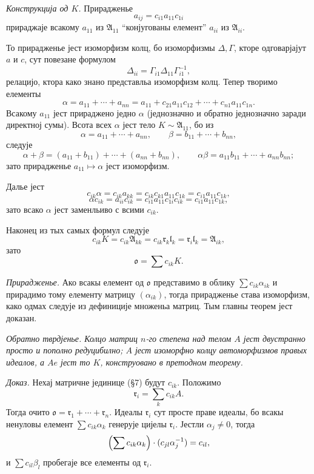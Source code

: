 ﻿\documentclass[11pt]{article}
\providecommand{\mA}{\mathfrak{A}}
\providecommand{\ml}{\mathfrak{l}}
\providecommand{\mo}{\mathfrak{o}}
\providecommand{\mr}{\mathfrak{r}}
\begin{document}

\emph{Конструкција од $K$.} Прирадженье
\[
        a_{ij}=c_{i1}a_{11}c_{1i}
\]
прираджаје всакому $a_{11}$ из $\mA_{11}$ ``конјугованы елемент'' $a_{ii}$ из $\mA_{ii}$.

То прирадженье јест изоморфизм колц, бо изоморфизмы $\Delta,\Gamma$, кторе одговарјајут $a$ и $c$, сут повезане формулом
\[
        \Delta_{ii}=\Gamma_{i1}\Delta_{11}\Gamma_{i1}^{-1},
\]
релацијо, ктора како знано представльа изоморфизм колц. Тепер творимо елементы
\[
        \alpha=a_{11}+\cdots+a_{nn}=a_{11}+c_{21}a_{11}c_{12}+\cdots+c_{n1}a_{11}c_{1n}.
\]
Всакому $a_{11}$ јест прираджено једно $\alpha$ (једнозначно и обратно једнозначно заради директној сумы). Всота всех $\alpha$ јест тело $K\sim\mA_{11}$, бо из
\[
        \alpha=a_{11}+\cdots+a_{nn},
        \qquad
        \beta=b_{11}+\cdots+b_{nn},
\]
следује
\[
        \alpha+\beta=(a_{11}+b_{11})+\cdots+(a_{nn}+b_{nn}),
        \qquad
        \alpha\beta=a_{11}b_{11}+\cdots+a_{nn}b_{nn};
\]
зато прирадженье $a_{11}\mapsto\alpha$ јест изоморфизм.

Далье јест
\[
        c_{ik}\alpha=c_{ik}a_{kk}=c_{ik}c_{k1}a_{11}c_{1k}=c_{i1}a_{11}c_{1k},
\]
\[
        \alpha c_{ik}=a_{ii}c_{ik}=c_{i1}a_{11}c_{1i}c_{ik}=c_{i1}a_{11}c_{1k},
\]
зато всако $\alpha$ јест заменльиво с всими $c_{ik}$.

Наконец из тых самых формул следује
\[
        c_{ik}K=c_{ik}\mA_{kk}=c_{ik}\mr_k\ml_k=\mr_i\ml_k=\mA_{ik},
\]
зато
\[
        \mo=\sum c_{ik}K.
\]

\emph{Прирадженье.} Ако всакы елемент од $\mo$ представимо в облику $\sum c_{ik}\alpha_{ik}$ и прирадимо тому елементу матрицу $(\alpha_{ik})$, тогда прирадженье става изоморфизм, како одмах следује из дефиниције множеньа матриц. Тым главны теорем јест доказан.

\emph{Обратно тврдјенье. Колцо матриц $n$-го степена над телом $A$ јест двустранно просто и пополно редуцибилно; $A$ јест изоморфно колцу автоморфизмов правых идеалов, а $Ae$ јест то $K$, конструовано в претодном теорему.}

\emph{Доказ.} Нехај матричне јединице (§7) будут $c_{ik}$. Положимо
\[
        \mr_i=\sum_k c_{ik}A.
\]
Тогда очито $\mo=\mr_1+\cdots+\mr_n$. Идеалы $\mr_i$ сут просте праве идеалы, бо всакы ненуловы елемент $\sum c_{ik}\alpha_k$ генерује цијелы $\mr_i$. Јестли $\alpha_j\ne0$, тогда
\[
        \Bigl(\sum c_{ik}\alpha_k\Bigr)\cdot(c_{jl}\alpha_j^{-1})=c_{il},
\]
и $\sum c_{il}\beta_l$ пробегаје все елементы од $\mr_i$.
\end{document}
